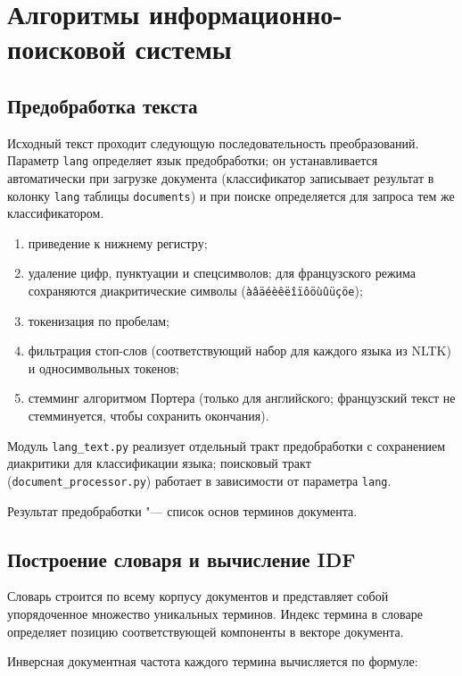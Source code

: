 \section{Алгоритмы информационно-поисковой системы}
\label{sec:algorithms}

\subsection{Предобработка текста}

Исходный текст проходит следующую последовательность преобразований.
Параметр \texttt{lang} определяет язык предобработки; он устанавливается
автоматически при загрузке документа (классификатор записывает результат
в колонку \texttt{lang} таблицы \texttt{documents}) и при поиске определяется
для запроса тем же классификатором.

\begin{enumerate}
	\item приведение к нижнему регистру;
	\item удаление цифр, пунктуации и спецсимволов; для французского режима
	сохраняются диакритические символы (\texttt{àâäéèêëîïôöùûüç\"{o}e});
	\item токенизация по пробелам;
	\item фильтрация стоп-слов (соответствующий набор для каждого языка
	из NLTK) и односимвольных токенов;
	\item стемминг алгоритмом Портера (только для английского; французский
	текст не стемминуется, чтобы сохранить окончания).
\end{enumerate}

Модуль \texttt{lang\_text.py} реализует отдельный тракт предобработки
с сохранением диакритики для классификации языка; поисковый тракт
(\texttt{document\_processor.py}) работает в зависимости от параметра
\texttt{lang}.

Результат предобработки "--- список основ терминов документа.

\subsection{Построение словаря и вычисление IDF}

Словарь строится по всему корпусу документов и представляет собой упорядоченное
множество уникальных терминов. Индекс термина в словаре определяет позицию
соответствующей компоненты в векторе документа.

Инверсная документная частота каждого термина вычисляется по формуле:

